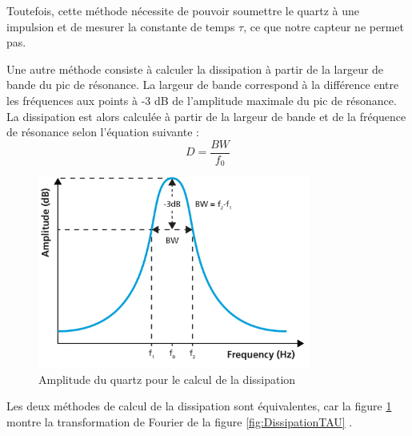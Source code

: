 Toutefois, cette méthode nécessite de pouvoir soumettre le quartz à une impulsion et de mesurer la constante de temps $\tau$, ce que notre capteur ne permet pas.

Une autre méthode consiste à calculer la dissipation à partir de la largeur de bande du pic de résonance.  
La largeur de bande correspond à la différence entre les fréquences aux points à -3 dB de l'amplitude maximale du pic de résonance.  
La dissipation est alors calculée à partir de la largeur de bande et de la fréquence de résonance selon l'équation suivante :
\begin{equation}
    D = \frac{BW}{f_0}
    \label{eq:DissipationWidth}
\end{equation}

\begin{figure}[H]
    \centering
    \includegraphics[width=0.8\textwidth]{assets/figures/Dissipation Capteur AMP FREQU.png}
    \caption{Amplitude du quartz pour le calcul de la dissipation \cite{Edvardsson2024Dissipation}}
    \label{fig:DissipationWidth}
\end{figure}

Les deux méthodes de calcul de la dissipation sont équivalentes,
car la figure \ref{fig:DissipationWidth} montre la transformation de Fourier de la figure \ref{fig:DissipationTAU} \cite{Edvardsson2024Dissipation}.

